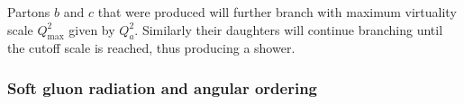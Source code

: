 Partons $b$ and $c$ that were produced will further branch with maximum virtuality scale $Q^2_\mathrm{max}$ given by $Q^2_a$. Similarly their daughters will continue branching until the cutoff scale is reached, thus producing a shower. 





\subsubsection{Soft gluon radiation and angular ordering}

